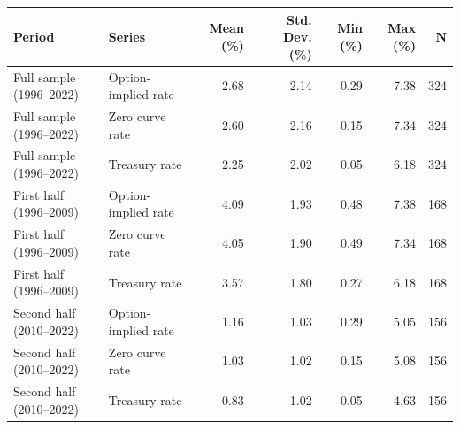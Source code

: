 \begin{tabular}{llrrrrr}
\toprule
Period & Series & Mean (\%) & Std. Dev. (\%) & Min (\%) & Max (\%) & N \\
\midrule
Full sample (1996--2022) & Option-implied rate & 2.68 & 2.14 & 0.29 & 7.38 & 324 \\
Full sample (1996--2022) & Zero curve rate & 2.60 & 2.16 & 0.15 & 7.34 & 324 \\
Full sample (1996--2022) & Treasury rate & 2.25 & 2.02 & 0.05 & 6.18 & 324 \\
First half (1996--2009) & Option-implied rate & 4.09 & 1.93 & 0.48 & 7.38 & 168 \\
First half (1996--2009) & Zero curve rate & 4.05 & 1.90 & 0.49 & 7.34 & 168 \\
First half (1996--2009) & Treasury rate & 3.57 & 1.80 & 0.27 & 6.18 & 168 \\
Second half (2010--2022) & Option-implied rate & 1.16 & 1.03 & 0.29 & 5.05 & 156 \\
Second half (2010--2022) & Zero curve rate & 1.03 & 1.02 & 0.15 & 5.08 & 156 \\
Second half (2010--2022) & Treasury rate & 0.83 & 1.02 & 0.05 & 4.63 & 156 \\
\bottomrule
\end{tabular}
